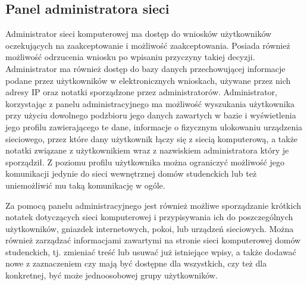 \documentclass[12pt,a4paper,notitlepage]{article}
\begin{document}
	\subsection{Panel administratora sieci}	
	Administrator sieci komputerowej ma dostęp do wniosków użytkowników oczekujących na zaakceptowanie i możliwość zaakceptowania. Posiada również możliwość odrzucenia wniosku po wpisaniu przyczyny takiej decyzji. Administrator ma również dostęp do bazy danych przechowującej informacje podane przez użytkowników w elektronicznych wnioskach, używane przez nich adresy IP oraz notatki sporządzone przez administratorów. Administrator, korzystając z panelu administracyjnego ma możliwość wyszukania użytkownika przy użyciu dowolnego podzbioru jego danych zawartych w bazie i wyświetlenia jego profilu zawierającego te dane, informacje o fizycznym ulokowaniu urządzenia sieciowego, przez które dany użytkownik łączy się z siecią komputerową, a także notatki związane z użytkownikiem wraz z nazwiskiem administratora który je sporządził. Z poziomu profilu użytkownika można ograniczyć możliwość jego komunikacji jedynie do sieci wewnętrznej domów studenckich lub też uniemożliwić mu taką komunikację w ogóle.

	Za pomocą panelu administracyjnego jest również możliwe sporządzanie krótkich notatek dotyczących sieci komputerowej i przypisywania ich do poszczególnych użytkowników, gniazdek internetowych, pokoi, lub urządzeń sieciowych. Można również zarządzać informacjami zawartymi na stronie sieci komputerowej domów studenckich, tj. zmieniać treść lub usuwać już istniejące wpisy, a także dodawać nowe z zaznaczeniem czy mają być dostępne dla wszystkich, czy też dla konkretnej, być może jednoosobowej grupy użytkowników.
\end{document}
